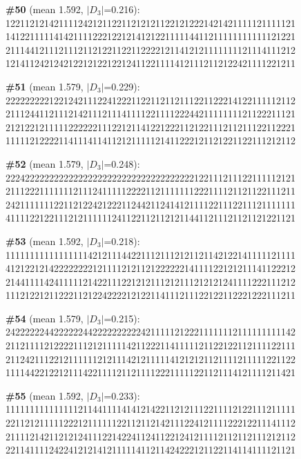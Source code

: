 \documentclass[10pt]{article}
\begin{document}
\noindent\textbf{\#50} (mean 1.592, $|D_3|$=0.216):\\
122112121421111242121122112121211221212221421421111121111121\\
141221111141421111222122121412122111114411211111111111121221\\
211144121112111211212211221122221211412121111111121114111212\\
121411242124212212122122124112211114121112112122421111221211\medskip

\noindent\textbf{\#51} (mean 1.579, $|D_3|$=0.229):\\
222222222122124211122412221122112112111221122214122111112112\\
211124411211121421112111411112211112224421111111121122211121\\
212122121111122222211122121141221222112122111211211122112221\\
111112122221141114114112121111121411222121121221122111212112\medskip

\noindent\textbf{\#52} (mean 1.579, $|D_3|$=0.248):\\
222422222222222222222222222222222222222122111211122111112121\\
211122211111112111241111122221121111111222111121121122111211\\
242111111122112122421222112442112414121111221112211121111111\\
411112212211121211111124112211211212114411211121121121221121\medskip

\noindent\textbf{\#53} (mean 1.592, $|D_3|$=0.218):\\
111111111111111114212111442211121112121121142122141111121111\\
412122121422222222121111212112122222214111122121211141122212\\
214411114241111121422111221212111212111212121241111222111212\\
111212212112221121224222212122114111211122122112221222111211\medskip

\noindent\textbf{\#54} (mean 1.579, $|D_3|$=0.215):\\
242222224422222244222222222242111112122211111112111111111142\\
211211112122221112121111142112221141111121122122112111122111\\
211242111221211111121211142121111141212121121111211111221122\\
111144221221211142211112112111122211111221121114121111211421\medskip

\noindent\textbf{\#55} (mean 1.592, $|D_3|$=0.233):\\
111111111111111211441111414121422112121112211112122111211111\\
221121211111222121111112211211214211122412111122212211141112\\
211112142112121241112214224112411221241211112112112111212112\\
221141111242241212141211111411211424222121122114114111121121\medskip
\end{document}

